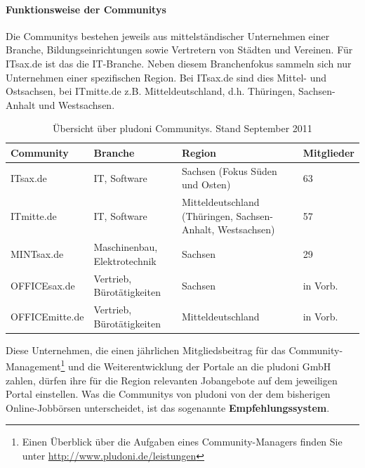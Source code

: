 \paragraph{Funktionsweise der Communitys}
Die Communitys bestehen jeweils aus mittelständischer Unternehmen einer Branche, Bildungseinrichtungen sowie Vertretern von Städten und Vereinen. Für ITsax.de ist das die IT-Branche. Neben diesem Branchenfokus sammeln sich nur Unternehmen einer spezifischen Region. Bei ITsax.de sind dies Mittel- und Ostsachsen, bei ITmitte.de z.B. Mitteldeutschland, d.h. Thüringen, Sachsen-Anhalt und Westsachsen.
\begin{table}[htbp]
\label{tb:dt}
\caption{Übersicht über pludoni Communitys. Stand September 2011}
\begin{tabular}{|l|p{3.8cm}|p{5cm}|l|}
\hline
\rowcolor{Gray}
Community & Branche & Region & Mitglieder \\\hline
ITsax.de & IT, Software &  Sachsen (Fokus Süden und Osten) & 63\\\hline
ITmitte.de & IT, Software &  Mitteldeutschland (Thüringen, Sachsen-Anhalt, Westsachsen) & 57 \\\hline
MINTsax.de & Maschinenbau, Elektrotechnik &  Sachsen & 29\\\hline
OFFICEsax.de & Vertrieb, Bürotätigkeiten &  Sachsen & in Vorb.\\\hline
OFFICEmitte.de & Vertrieb, Bürotätigkeiten &  Mitteldeutschland & in Vorb.\\\hline
\end{tabular}
\end{table}



Diese Unternehmen, die einen jährlichen Mitgliedsbeitrag für das Community\hyp{}Management\footnote{Einen Überblick über die Aufgaben eines Community-Managers finden Sie unter \url{http://www.pludoni.de/leistungen}} und die Weiterentwicklung der Portale an die pludoni GmbH zahlen, dürfen ihre für die Region relevanten Jobangebote auf dem jeweiligen Portal einstellen. Was die Communitys von pludoni von der dem bisherigen Online-Jobbörsen unterscheidet, ist das sogenannte \textbf{Empfehlungssystem}.

